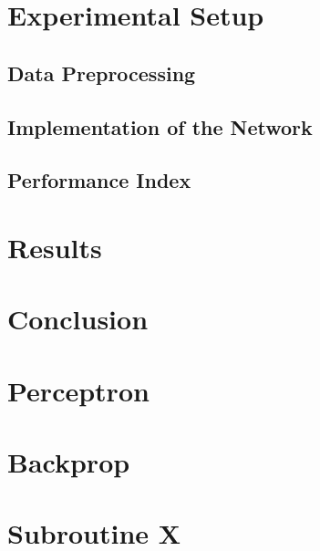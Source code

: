 \documentclass[12pt,halfline,a4paper]{ouparticle}
\begin{document}
\section{Experimental Setup}
\label{sec5}

\subsection{Data Preprocessing}
\label{sec5.1}

\subsection{Implementation of the Network}
\label{sec5.2}

\subsection{Performance Index}
\label{sec5.3}

\section{Results}
\label{sec6}

\section{Conclusion}
\label{sec7}


\pagebreak

\printbibliography[heading=bibintoc, title={References}]

\pagebreak
\appendix

\section{Perceptron}
\section{Backprop}
\section{Subroutine X}
\end{document}
